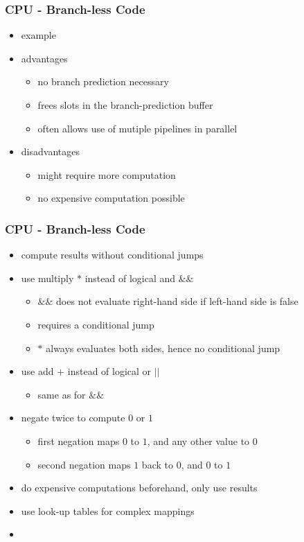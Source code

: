 \begin{frame}
 \frametitle{CPU - Branch-less Code}
 \begin{itemize}
  \item example 
  \item advantages
  \begin{itemize}
   \item no branch prediction necessary
   \item frees slots in the branch-prediction buffer
   \item often allows use of mutiple pipelines in parallel
  \end{itemize}
  \item disadvantages
  \begin{itemize}
   \item might require more computation
   \item no expensive computation possible
  \end{itemize}
 \end{itemize}
\end{frame}

\begin{frame}
 \frametitle{CPU - Branch-less Code}
 \begin{itemize}
  \item compute results without conditional jumps
  \item use multiply \( * \) instead of logical and \( \&\& \)
   \begin{itemize}
    \item \( \&\& \) does not evaluate right-hand side if left-hand side is false
    \item requires a conditional jump
    \item \( * \) always evaluates both sides, hence no conditional jump
   \end{itemize}
  \item use add \( + \) instead of logical or \( \vert\vert \)
   \begin{itemize}
    \item same as for \( \&\& \)
   \end{itemize}
  \item negate twice to compute \( 0 \) or \( 1 \)
   \begin{itemize}
    \item first negation maps \( 0 \) to \( 1 \), and any other value to 0
    \item second negation maps \( 1 \) back to \( 0 \), and \( 0 \) to \( 1 \)
   \end{itemize}
  \item do expensive computations beforehand, only use results
  \item use look-up tables for complex mappings
  \item {}
 \end{itemize}
\end{frame}

